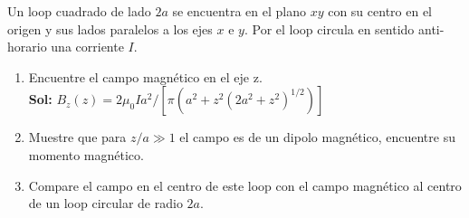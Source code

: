 \np
Un loop cuadrado de lado $2a$ se encuentra en el plano $xy$ con su centro en el origen y sus lados paralelos a los ejes $x$ e $y$. Por el loop circula en sentido anti-horario una corriente $I$.

\begin{enumerate}
	\item Encuentre el campo magnético en el eje z.\\

\textbf{Sol:} $B_z(z) = 2 \mu_0 Ia^2 /[\pi(a^2 + z^2 (2a^2 + z^2 )^{1/2} )]$
	\item Muestre que para $z/a \gg 1$ el campo es de un dipolo magnético, encuentre su momento magnético.
	\item Compare el campo en el centro de este loop con el campo magnético al centro de un loop circular de radio $2a$.
\end{enumerate}



\newpage